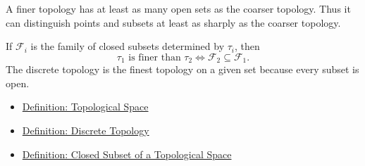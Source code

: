 \begin{remark*}[Interpretation]
A finer topology has at least as many open sets as the coarser topology.
Thus it can distinguish points and subsets at least as sharply as the coarser
topology.
\end{remark*}

\begin{remark*}[Examples]
If \(\mathcal{F}_i\) is the family of closed subsets determined by
\(\tau_i\), then
\[
\tau_1\text{ is finer than }\tau_2
\Longleftrightarrow
\mathcal{F}_2\subseteq\mathcal{F}_1.
\]
The discrete topology is the finest topology on a given set because every
subset is open.
\end{remark*}

\begin{dependencies}
\begin{itemize}
  \item \hyperref[def:topological-space]{Definition: Topological Space}
  \item \hyperref[def:discrete-topology]{Definition: Discrete Topology}
  \item \hyperref[def:topological-closed-subset]{Definition: Closed Subset of a Topological Space}
\end{itemize}
\end{dependencies}
